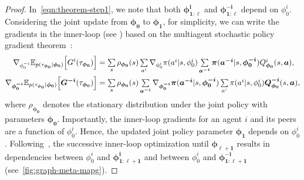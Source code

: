 \begin{proof}
In~\cref{eqn:theorem-step1}, we note that both $\bm{\phi}^{\bm{i}}_{\bm{1:\ell}}$ and $\bm{\phi}^{\bm{-i}}_{\bm{1:\ell}}$ depend on $\phi^{i}_{0}$. 
Considering the joint update from $\bm{\phi}_{\bm{0}}$ to $\bm{\phi}_{\bm{1}}$, for simplicity, we can write the gradients in the inner-loop (see ) based on the multiagent stochastic policy gradient theorem~\citep{wei18multiagent-softQ}:
\begin{align}\label{eqn:theorem-step2}
\begin{split}
\nabla_{\phi^{-i}_{0}}\mathbb{E}_{p(\tau_{\bm{\phi}_{\bm{0}}}|\bm{\phi}_{\bm{0}})}\Big[G^{i}(\tau_{\bm{\phi}_{\bm{0}}})\Big]&=\textstyle\sum\limits_{s}\rho_{\bm{\phi}_{\bm{0}}}(s)\textstyle\sum\limits_{a^{i}}\nabla_{\phi^{i}_{0}}\pi(a^{i}|s,\phi^{i}_{0})\textstyle\sum\limits_{\bm{a}^{\bm{-i}}}\bm{\pi}(\bm{a}^{\bm{-i}}|s,\bm{\phi}^{\bm{-i}}_{\bm{0}})Q^{i}_{\bm{\phi}_{\bm{0}}}(s,\bm{a}),\\
\nabla_{\bm{\phi}^{\bm{-i}}_{\bm{0}}}\mathbb{E}_{p(\tau_{\bm{\phi}_{\bm{0}}}|\bm{\phi}_{\bm{0}})}\Big[\bm{G}^{\bm{-i}}(\tau_{\bm{\phi}_{\bm{0}}})\Big]&=\textstyle\sum\limits_{s}\rho_{\bm{\phi}_{\bm{0}}}(s)\textstyle\sum\limits_{\bm{a}^{\bm{-i}}}\nabla_{\bm{\phi}^{\bm{-i}}_{\bm{0}}}\bm{\pi}(\bm{a}^{\bm{-i}}|s,\bm{\phi}^{\bm{-i}}_{\bm{0}})\textstyle\sum\limits_{a^{i}}\pi(a^{i}|s,\phi^{i}_{0})\bm{Q}^{\bm{-i}}_{\bm{\phi}_{\bm{0}}}(s,\bm{a}),
\end{split}
\end{align}
where $\rho_{\bm{\phi}_{\bm{0}}}$ denotes the stationary distribution under the joint policy with parameters $\bm{\phi}_{\bm{0}}$.
Importantly, the inner-loop gradients for an agent $i$ and its peers are a function of $\phi^{i}_{0}$. 
Hence, the updated joint policy parameter $\bm{\phi}_{\bm{1}}$ depends on $\phi^{i}_{0}$. 
Following~, the successive inner-loop optimization until $\bm{\phi}_{\bm{\ell+1}}$ results in dependencies between $\phi^{i}_{0}$ and $\bm{\phi}^{\bm{i}}_{\bm{1:\ell+1}}$ and between $\phi^{i}_{0}$ and $\bm{\phi}^{\bm{-i}}_{\bm{1:\ell+1}}$ (see~\cref{fig:graph-meta-mapg}).


\end{proof}
